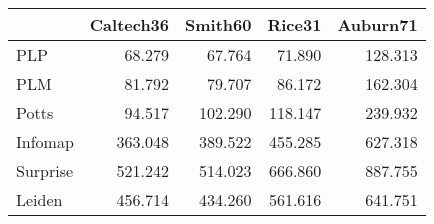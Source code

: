 \begin{tabular}{lrrrr}
\toprule
{} & Caltech36 & Smith60 &  Rice31 & Auburn71 \\
\midrule
PLP      &    68.279 &  67.764 &  71.890 &  128.313 \\
PLM      &    81.792 &  79.707 &  86.172 &  162.304 \\
Potts    &    94.517 & 102.290 & 118.147 &  239.932 \\
Infomap  &   363.048 & 389.522 & 455.285 &  627.318 \\
Surprise &   521.242 & 514.023 & 666.860 &  887.755 \\
Leiden   &   456.714 & 434.260 & 561.616 &  641.751 \\
\bottomrule
\end{tabular}
